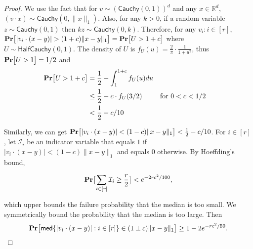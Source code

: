 \documentclass[11pt]{article}
\newcommand{\med}{\mathsf{med}}
\theoremstyle{plain}
\newcommand{\pr}[1]{\text{\bf Pr}\normalfont\bigl[ #1 \bigr]}
\newcommand{\R}{\mathbb{R}}
\begin{document}
\begin{proof}
    We use the fact that for $v \sim (\mathsf{Cauchy}(0, 1))^d$ and any $x \in \R^d$, $(v \cdot x) \sim \mathsf{Cauchy}(0, \lVert x \rVert_1)$. Also, for any $k > 0$, if a random variable $z \sim \mathsf{Cauchy}(0, 1)$ then $kz \sim \mathsf{Cauchy}(0, k)$. Therefore, for any $v_i : i \in [r]$, $\pr{|v_i \cdot (x - y)| > (1+c) \lVert x- y\rVert_1} = \pr{U > 1+c}$ where $U\sim \mathsf{HalfCauchy}(0, 1)$. The density of $U$ is $f_U(u) = \frac{2}{\pi}\cdot \frac{1}{1+u^2}$, thus $ \pr{U > 1} = 1/2$ and
    \begin{align*}
        \pr{U > 1+c} &= \frac{1}{2} - \int^{1+c}_1 f_U(u) du \\
        &\leq \frac{1}{2} - c \cdot f_U(3/2) && \text{for $0<c<1/2$}\\
        &< \frac{1}{2} - c/10
    \end{align*}

    Similarly, we can get $\pr{|v_i \cdot (x - y)| < (1-c) \lVert x- y\rVert_1} < \frac{1}{2} - c/10$. For $i \in [r]$, let $\mathcal{I}_i$ be an indicator variable that equals $1$ if $|v_i \cdot (x - y)| < (1-c) \lVert x- y\rVert_1$ and equals $0$ otherwise. By Hoeffding's bound,

    \[\pr{\sum_{i \in [r]} \mathcal{I}_i  \geq \frac{r}{2}} < e^{-2rc^2/100},\]

    which upper bounds the failure probability that the median is too small. We symmetrically bound the probability that the median is too large. Then \[\pr{\med\{|v_i \cdot (x -y) | : i \in [r]\} \in (1\pm c) \lVert x - y\rVert_1} \geq {1-2e^{-rc^2/50}}.\]
    
\end{proof} 
\end{document}
